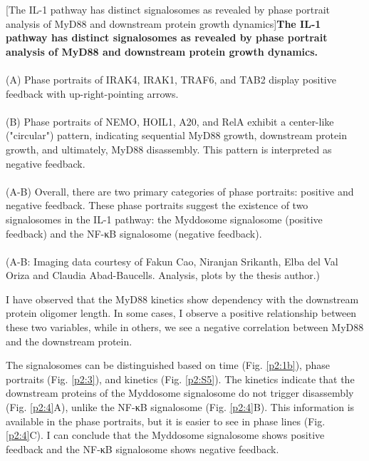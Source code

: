 \begin{centering}
\captionsetup{parbox=none}
[The IL-1 pathway has distinct signalosomes as revealed by phase portrait analysis of MyD88 and downstream protein growth dynamics]{\textbf{The IL-1 pathway has distinct signalosomes as revealed by phase portrait analysis of MyD88 and downstream protein growth dynamics.} 
\\
\\
(A) Phase portraits of IRAK4, IRAK1, TRAF6, and TAB2 display positive feedback with up-right-pointing arrows.
\\
\\
(B) Phase portraits of NEMO, HOIL1, A20, and RelA exhibit a center-like ("circular") pattern, indicating sequential MyD88 growth, downstream protein growth, and ultimately, MyD88 disassembly. This pattern is interpreted as negative feedback.
\\
\\
(A-B) Overall, there are two primary categories of phase portraits: positive and negative feedback. These phase portraits suggest the existence of two signalosomes in the IL-1 pathway: the Myddosome signalosome (positive feedback) and the NF-κB signalosome (negative feedback).
\\
\\
(A-B: Imaging data courtesy of Fakun Cao, Niranjan Srikanth, Elba del Val Oriza and Claudia Abad-Baucells. Analysis, plots by the thesis author.)}
\label{p2:3b}
\end{centering}

I have observed that the MyD88 kinetics show dependency with the downstream protein oligomer length. In some cases, I observe a positive relationship between these two variables, while in others, we see a negative correlation between MyD88 and the downstream protein.

The signalosomes can be distinguished based on time (Fig. \ref{p2:1b}), phase portraits (Fig. \ref{p2:3}), and kinetics (Fig. \ref{p2:S5}). The kinetics indicate that the downstream proteins of the Myddosome signalosome do not trigger disassembly (Fig. \ref{p2:4}A), unlike the NF-κB signalosome (Fig. \ref{p2:4}B). This information is available in the phase portraits, but it is easier to see in phase lines (Fig. \ref{p2:4}C). I can conclude that the Myddosome signalosome shows positive feedback and the NF-κB signalosome shows negative feedback.

